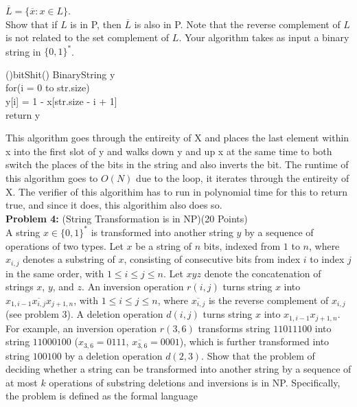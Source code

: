 \documentclass[11pt]{amsart}
\begin{document}
$\overline{L} = \{ \overline{x} : x \in L \}$. \\

Show that if $L$ is in P, then $\overline{L}$ is also in P. Note that the reverse complement of $L$ is not related to the set complement of $L$. Your algorithm takes as input a binary string in $\{ 0, 1 \}^*$.
\begin{algorithm}[H]
    \Fn(){bitShit()}{
    \SetAlgoLined
    \SetNoFillComment
    BinaryString y\\
    for(i = 0 to str.size)\\
        \hspace{.5cm}y[i] = 1 - x[str.size - i + 1]\\
    return y\\
    }
\end{algorithm}
\smallskip
This algorithm goes through the entireity of X and places the last element within x into the first slot of y and walks down y and up x at the same time to both switch the places of the bits in the string and also inverts the bit. The runtime of this algorithm goes to $O(N)$ due to the loop, it iterates through the entireity of X. The verifier of this algorithim has to run in polynomial time for this to return true, and since it does, this algorithim also does so.
\newpage
\hrulefill \\
\textbf{Problem 4:} (String Transformation is in NP)\hfill (20 Points)\\

A string $x \in \{ 0, 1 \}^*$ is transformed into another string $y$ by a sequence of operations of two types. Let $x$ be a string of $n$ bits, indexed from $1$ to $n$, where $x_{i,j}$ denotes a substring of $x$, consisting of consecutive bits from index $i$ to index $j$ in the same order, with $1 \leq i \leq j \leq n$. Let $xyz$ denote the concatenation of strings $x$, $y$, and $z$. An inversion operation $r(i,j)$ turns string $x$ into $x_{1, i-1} \overline{x_{i, j}} x_{j+1, n}$, with $1 \leq i \leq j \leq n$, where $\overline{x_{i, j}}$ is the reverse complement of $x_{i, j}$ (see problem 3). A deletion operation $d(i,j)$ turns string $x$ into $x_{1, i-1} x_{j+1, n}$. For example, an inversion operation $r(3, 6)$ transforms string $11011100$ into string $11000100$ ($x_{3, 6} = 0111$, $\overline{x_{3, 6}} = 0001$), which is further transformed into string $100100$ by a deletion operation $d(2, 3)$.
Show that the problem of deciding whether a string can be
transformed into another string by a sequence of at most $k$ operations of
substring deletions and inversions is in NP. Specifically, the problem is defined
as the formal language \\
\end{document}
